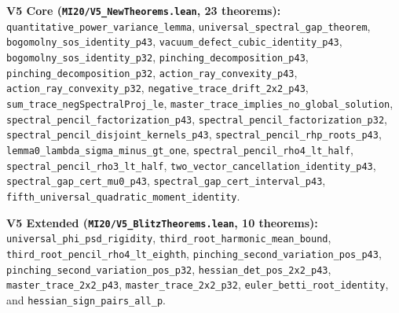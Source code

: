 \documentclass[10pt,letterpaper]{article}
\begin{document}
\begin{tcolorbox}[leanbox]
{\textbf{V5 Core (\texttt{MI20/V5\_NewTheorems.lean}, 23 theorems):} \texttt{quantitative\_power\_variance\_lemma}, \texttt{universal\_spectral\_gap\_theorem}, \texttt{bogomolny\_sos\_identity\_p43}, \texttt{vacuum\_defect\_cubic\_identity\_p43}, \texttt{bogomolny\_sos\_identity\_p32}, \texttt{pinching\_decomposition\_p43}, \texttt{pinching\_decomposition\_p32}, \texttt{action\_ray\_convexity\_p43}, \texttt{action\_ray\_convexity\_p32}, \texttt{negative\_trace\_drift\_2x2\_p43}, \texttt{sum\_trace\_negSpectralProj\_le}, \texttt{master\_trace\_implies\_no\_global\_solution}, \texttt{spectral\_pencil\_factorization\_p43}, \texttt{spectral\_pencil\_factorization\_p32}, \texttt{spectral\_pencil\_disjoint\_kernels\_p43}, \texttt{spectral\_pencil\_rhp\_roots\_p43}, \texttt{lemma0\_lambda\_sigma\_minus\_gt\_one}, \texttt{spectral\_pencil\_rho4\_lt\_half}, \texttt{spectral\_pencil\_rho3\_lt\_half}, \texttt{two\_vector\_cancellation\_identity\_p43}, \texttt{spectral\_gap\_cert\_mu0\_p43}, \texttt{spectral\_gap\_cert\_interval\_p43}, \texttt{fifth\_universal\_quadratic\_moment\_identity}.\par\vspace{1.5pt}
\textbf{V5 Extended (\texttt{MI20/V5\_BlitzTheorems.lean}, 10 theorems):} \texttt{universal\_phi\_psd\_rigidity}, \texttt{third\_root\_harmonic\_mean\_bound}, \texttt{third\_root\_pencil\_rho4\_lt\_eighth}, \texttt{pinching\_second\_variation\_pos\_p43}, \texttt{pinching\_second\_variation\_pos\_p32}, \texttt{hessian\_det\_pos\_2x2\_p43}, \texttt{master\_trace\_2x2\_p43}, \texttt{master\_trace\_2x2\_p32}, \texttt{euler\_betti\_root\_identity}, and \texttt{hessian\_sign\_pairs\_all\_p}.\par}
\end{tcolorbox}
\end{document}
